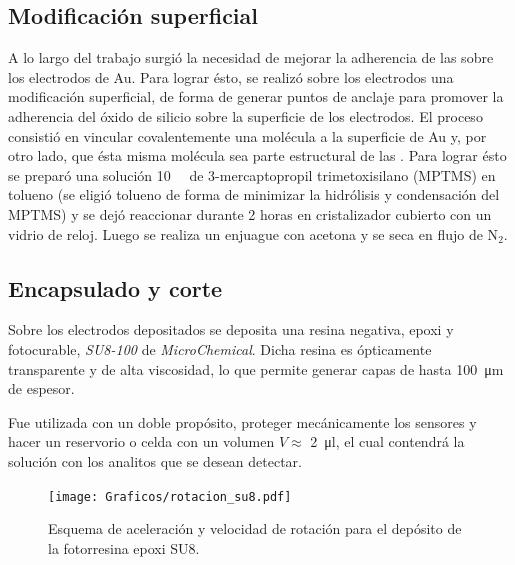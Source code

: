 		 

	\subsection{Modificación superficial}\label{sec:silanizacion}
		
		A lo largo del trabajo surgió la necesidad de mejorar la adherencia de las \pdm\space sobre los electrodos de Au. Para lograr ésto, se realizó sobre los electrodos una modificación superficial, de forma de generar puntos de anclaje para promover la adherencia del óxido de silicio sobre la superficie de los electrodos.
		El proceso consistió en vincular covalentemente una molécula a la superficie de Au y, por otro lado, que ésta misma molécula sea parte estructural de las \pdm. Para lograr ésto se preparó una solución \SI{10}{\milli\Molar} de 3-mercaptopropil trimetoxisilano (MPTMS) en tolueno (se eligió tolueno de forma de minimizar la hidrólisis y condensación del MPTMS) y se dejó reaccionar durante 2 horas en cristalizador cubierto con un vidrio de reloj. \cite{Goss1991,Herzog2013} Luego se realiza un enjuague con acetona y se seca en flujo de N$_2$.

	\subsection{Encapsulado y corte}\label{sec:corte}

		Sobre los electrodos depositados se deposita una resina negativa, epoxi y fotocurable, \textit{SU8-100} de \textit{MicroChemical}\cite{MicrochemicalsTeam2009}. Dicha resina es ópticamente transparente y de alta viscosidad, lo que permite generar capas de hasta \SI{100}{\um} de espesor. 

		Fue utilizada con un doble propósito, proteger mecánicamente los sensores y hacer un reservorio o celda con un volumen  $V \approx$ \SI{2}{\ul}, el cual contendrá la solución con los analitos que se desean detectar.  
			\begin{figure}[b!]
			 		  \begin{center}
			 		  \texttt{[image: Graficos/rotacion\_su8.pdf]}
			 		  \caption[Parámetros de depósito para la resina expoxi]{Esquema de aceleración y velocidad de rotación para el depósito de la fotorresina epoxi SU8.}
			 		  \label{fig:spin-su8}
			 		  \end{center}
			 		  \end{figure}
			
